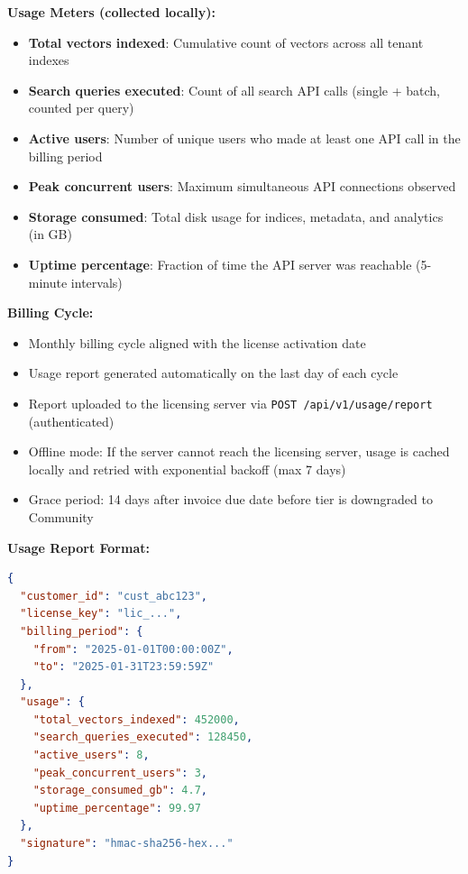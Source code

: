 \documentclass[11pt,a4paper]{article}
\newcommand{\inlinecode}[1]{\texttt{\small\colorbox{ctCodeBg}{#1}}}
\begin{document}
\begin{reqbox}
\textbf{Usage Meters (collected locally):}
\begin{itemize}
    \item \textbf{Total vectors indexed}: Cumulative count of vectors across all tenant indexes
    \item \textbf{Search queries executed}: Count of all search API calls (single + batch, counted per query)
    \item \textbf{Active users}: Number of unique users who made at least one API call in the billing period
    \item \textbf{Peak concurrent users}: Maximum simultaneous API connections observed
    \item \textbf{Storage consumed}: Total disk usage for indices, metadata, and analytics (in GB)
    \item \textbf{Uptime percentage}: Fraction of time the API server was reachable (5-minute intervals)
\end{itemize}

\textbf{Billing Cycle:}
\begin{itemize}
    \item Monthly billing cycle aligned with the license activation date
    \item Usage report generated automatically on the last day of each cycle
    \item Report uploaded to the licensing server via \inlinecode{POST /api/v1/usage/report} (authenticated)
    \item Offline mode: If the server cannot reach the licensing server, usage is cached locally and retried with exponential backoff (max 7 days)
    \item Grace period: 14 days after invoice due date before tier is downgraded to Community
\end{itemize}

\textbf{Usage Report Format:}
\begin{lstlisting}[language=JSON]
{
  "customer_id": "cust_abc123",
  "license_key": "lic_...",
  "billing_period": {
    "from": "2025-01-01T00:00:00Z",
    "to": "2025-01-31T23:59:59Z"
  },
  "usage": {
    "total_vectors_indexed": 452000,
    "search_queries_executed": 128450,
    "active_users": 8,
    "peak_concurrent_users": 3,
    "storage_consumed_gb": 4.7,
    "uptime_percentage": 99.97
  },
  "signature": "hmac-sha256-hex..."
}
\end{lstlisting}


\end{reqbox}
\end{document}
